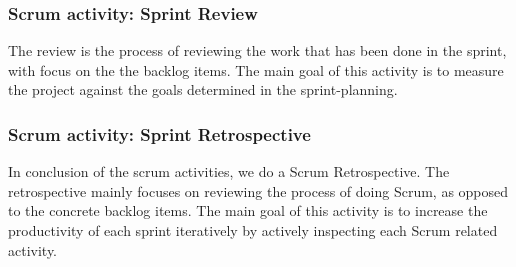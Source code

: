 \subsubsection{Scrum activity: Sprint Review}
The review is the process of reviewing the work that has been done in the sprint, with focus on the the backlog items. The main goal of this activity is to measure the project against the goals determined in the sprint-planning.

\subsubsection{Scrum activity: Sprint Retrospective}
In conclusion of the scrum activities, we do a Scrum Retrospective. The retrospective mainly focuses on reviewing the process of doing Scrum, as opposed to the concrete backlog items. The main goal of this activity is to increase the productivity of each sprint iteratively by actively inspecting each Scrum related activity.